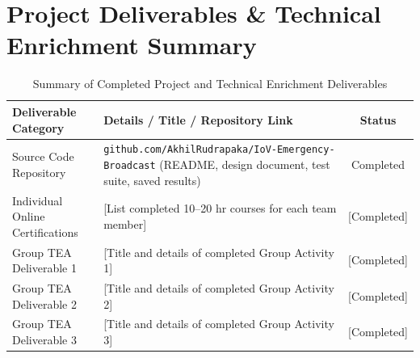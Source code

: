 \documentclass[11pt, a4paper]{article}
\begin{document}
\section{Project Deliverables \& Technical Enrichment Summary}
\begin{table}[H]
    \centering
    \footnotesize
    \renewcommand{\arraystretch}{1.2}
    \begin{tabular}{|p{4.2cm}|p{7.5cm}|c|}
        \hline
        \textbf{Deliverable Category} & \textbf{Details / Title / Repository Link} & \textbf{Status} \\
        \hline
        Source Code Repository & \texttt{github.com/AkhilRudrapaka/\allowbreak IoV-Emergency-Broadcast} (README, design document, test suite, saved results) & Completed \\
        \hline
        Individual Online Certifications & {[List completed 10--20 hr courses for each team member]} & {[Completed]} \\
        \hline
        Group TEA Deliverable 1 & {[Title and details of completed Group Activity 1]} & {[Completed]} \\
        \hline
        Group TEA Deliverable 2 & {[Title and details of completed Group Activity 2]} & {[Completed]} \\
        \hline
        Group TEA Deliverable 3 & {[Title and details of completed Group Activity 3]} & {[Completed]} \\
        \hline
    \end{tabular}
    \caption{Summary of Completed Project and Technical Enrichment Deliverables}
\end{table}

\vspace{0.2cm}
\nocite{*}
\renewcommand{\refname}{\large\bfseries\color{amritaMaroon}References}


\end{document}
